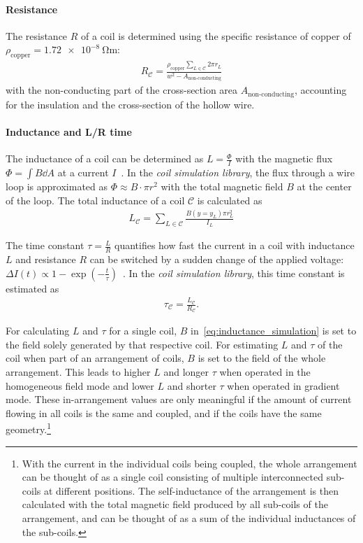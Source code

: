 \paragraph{Resistance}
The resistance $R$ of a coil is determined using the specific resistance of copper of $\rho_\text{copper} = \SI{1.72e-8}{\ohm\meter}$:
\begin{align}\label{eq:resistance_simulation}
    R_\mathcal{C} = \frac{\rho_\text{copper} \sum\limits_{L \in \mathcal{C}} 2\pi r_L} {w^2 - A_\text{non-conducting}}
\end{align}
with the non-conducting part of the cross-section area $A_\text{non-conducting}$, accounting for the insulation and the cross-section of the hollow wire.

\paragraph{Inductance and L/R time} The inductance of a coil can be determined as $L = \frac{\Phi}{I}$ with the magnetic flux $\Phi = \int B \dd A$ at a current $I$~\cite{demtroder_zeitlich_2013}. In the \textit{coil simulation library}, the flux through a wire loop is approximated as $\Phi \approx B \cdot \pi r^2$ with the total magnetic field $B$ at the center of the loop. The total inductance of a coil $\mathcal{C}$ is calculated as
\begin{align}\label{eq:inductance_simulation}
    L_\mathcal{C} = \sum\limits_{L \in \mathcal{C}} \frac{B(y = y_L) \pi r_L^2}{I_L}
\end{align}

The time constant $\tau = \frac{L}{R}$ quantifies how fast the current in a coil with inductance $L$ and resistance $R$ can be switched by a sudden change of the applied voltage: $\Delta I(t) \propto 1-\exp \left(-\frac{t}{\tau}\right)$~\cite{demtroder_zeitlich_2013}. In the \textit{coil simulation library}, this time constant is estimated as
\begin{align}\label{eq:time_constant_simulation}
    \tau_\mathcal{C} = \frac{L_\mathcal{C}}{R_\mathcal{C}}.
\end{align}

For calculating $L$ and $\tau$ for a single coil, $B$ in~\eqref{eq:inductance_simulation} is set to the field solely generated by that respective coil. For estimating $L$ and $\tau$ of the coil when part of an arrangement of coils, $B$ is set to the field of the whole arrangement. This leads to higher $L$ and longer $\tau$ when operated in the homogeneous field mode and lower $L$ and shorter $\tau$ when operated in gradient mode. These in-arrangement values are only meaningful if the amount of current flowing in all coils is the same and coupled, and if the coils have the same geometry.\footnote{With the current in the individual coils being coupled, the whole arrangement can be thought of as a single coil consisting of multiple interconnected sub-coils at different positions. The self-inductance of the arrangement is then calculated with the total magnetic field produced by all sub-coils of the arrangement, and can be thought of as a sum of the individual inductances of the sub-coils.}

